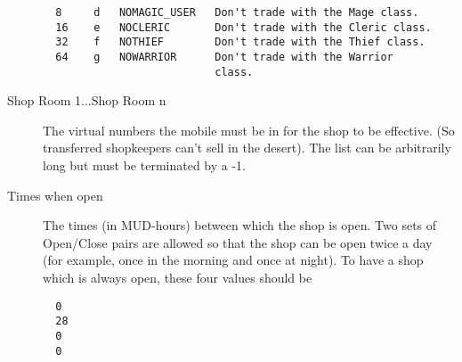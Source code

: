 \documentclass[11pt]{article}
\begin{document}
\begin{description}
\begin{verbatim}
  8     d   NOMAGIC_USER   Don't trade with the Mage class.
  16    e   NOCLERIC       Don't trade with the Cleric class.
  32    f   NOTHIEF        Don't trade with the Thief class.
  64    g   NOWARRIOR      Don't trade with the Warrior
                           class.
\end{verbatim}
\item[Shop Room 1...Shop Room n] The virtual numbers the mobile must be in for the shop to be effective. (So transferred shopkeepers can't sell in the desert).  The list can be arbitrarily long but must be terminated by a -1.
\item[Times when open] The times (in MUD-hours) between which the shop is open.  Two sets of Open/Close pairs are allowed so that the shop can be open twice a day (for example, once in the morning and once at night). To have a shop which is always open, these four values should be
\begin{verbatim}
  0
  28
  0
  0
\end{verbatim}
\end{description}
\end{document}
